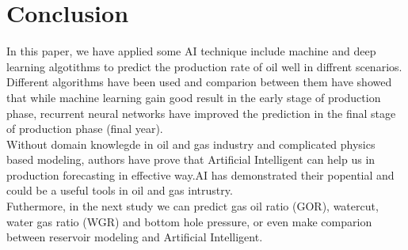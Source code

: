 \documentclass[english]{article}
\makeatletter
\def\maxwidth{\ifdim\Gin@nat@width>\linewidth\linewidth
    \else\Gin@nat@width\fi}
\let\Oldincludegraphics\includegraphics
\renewcommand{\includegraphics}[1]{\Oldincludegraphics[width=.8\maxwidth]{#1}}
\makeatother
\begin{document}
%



\section{Conclusion}
In this paper, we have applied some AI technique include machine and deep learning algotithms to predict the production rate of oil well in diffrent scenarios. Different algorithms have been used and comparion between them have showed that while machine learning gain good result in the early stage of production phase, recurrent neural networks have improved the prediction in the final stage of production phase (final year).\\
Without domain knowlegde in oil and gas industry and complicated physics based modeling, authors have prove that Artificial Intelligent can help us in production forecasting in effective way.AI has demonstrated their popential and could be a useful tools in oil and gas intrustry.\\
Futhermore, in the next study we can predict gas oil ratio (GOR), watercut, water gas ratio (WGR) and bottom hole pressure, or even make comparion between reservoir modeling and Artificial Intelligent.
  
\end{document}
